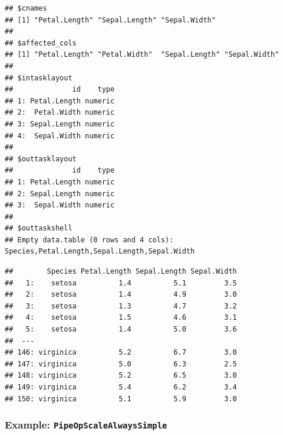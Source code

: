 \documentclass[
]{scrbook}
\newenvironment{Shaded}{\begin{snugshade}}{\end{snugshade}}
\newcommand{\DecValTok}[1]{\textcolor[rgb]{0.00,0.00,0.81}{#1}}
\newcommand{\FunctionTok}[1]{\textcolor[rgb]{0.00,0.00,0.00}{#1}}
\newcommand{\NormalTok}[1]{#1}
\newcommand{\OtherTok}[1]{\textcolor[rgb]{0.56,0.35,0.01}{#1}}
\newcommand{\SpecialCharTok}[1]{\textcolor[rgb]{0.00,0.00,0.00}{#1}}
\renewenvironment{Shaded} {\begin{snugshade}\small} {\end{snugshade}}
\begin{document}
\begin{Shaded}
\end{Shaded}

\begin{verbatim}
## $cnames
## [1] "Petal.Length" "Sepal.Length" "Sepal.Width" 
## 
## $affected_cols
## [1] "Petal.Length" "Petal.Width"  "Sepal.Length" "Sepal.Width" 
## 
## $intasklayout
##              id    type
## 1: Petal.Length numeric
## 2:  Petal.Width numeric
## 3: Sepal.Length numeric
## 4:  Sepal.Width numeric
## 
## $outtasklayout
##              id    type
## 1: Petal.Length numeric
## 2: Sepal.Length numeric
## 3:  Sepal.Width numeric
## 
## $outtaskshell
## Empty data.table (0 rows and 4 cols): Species,Petal.Length,Sepal.Length,Sepal.Width
\end{verbatim}

\begin{Shaded}
\end{Shaded}

\begin{verbatim}
##        Species Petal.Length Sepal.Length Sepal.Width
##   1:    setosa          1.4          5.1         3.5
##   2:    setosa          1.4          4.9         3.0
##   3:    setosa          1.3          4.7         3.2
##   4:    setosa          1.5          4.6         3.1
##   5:    setosa          1.4          5.0         3.6
##  ---                                                
## 146: virginica          5.2          6.7         3.0
## 147: virginica          5.0          6.3         2.5
## 148: virginica          5.2          6.5         3.0
## 149: virginica          5.4          6.2         3.4
## 150: virginica          5.1          5.9         3.0
\end{verbatim}

\hypertarget{example-pipeopscalealwayssimple}{%
\subsubsection{\texorpdfstring{Example: \texttt{PipeOpScaleAlwaysSimple}}{Example: PipeOpScaleAlwaysSimple}}\label{example-pipeopscalealwayssimple}}
\end{document}

